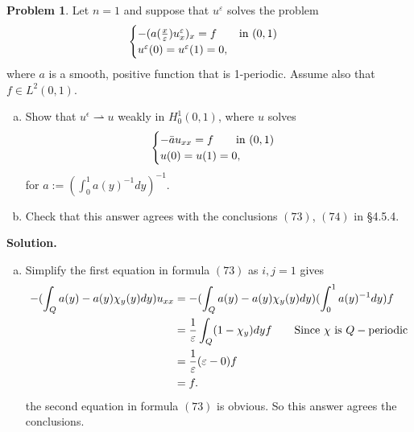 \documentclass[a4paper]{book}
\newenvironment{solution}%
{\noindent\textbf{Solution.}}%
{\qedhere}
\numberwithin{equation}{chapter}
\theoremstyle{definition}
\newtheorem{pro}[exm]{Problem}
\begin{document}
\begin{pro}
  Let $n = 1$ and  suppose that $u^\varepsilon$ solves the problem
  \begin{align*}
    \begin{cases}
      -(a(\frac{x}{\varepsilon})u_x^\varepsilon)_x = f \qquad \textmd{in } (0,1) \\
      u^\varepsilon(0) = u^\varepsilon(1) = 0,
    \end{cases}
  \end{align*}
  where $a$ is a smooth, positive function that is 1-periodic. Assume also that $f \in L^2(0,1)$.
  \begin{enumerate}[(a)]
  \item Show that $u^\epsilon \rightharpoonup u$ weakly in $H^1_0(0,1)$, where $u$ solves
    \begin{align*}
      \begin{cases}
        - \bar{a} u_{xx} = f \qquad \textmd{in } (0,1) \\
        u(0) = u(1) = 0,
      \end{cases}
    \end{align*}
    for $a := (\int^1_0 a(y)^{-1} dy)^{-1}$.

  \item Check that this answer agrees with the conclusions $(73)$, $(74)$ in \S4.5.4.
  \end{enumerate}
\end{pro}

\begin{solution}
  \begin{enumerate}[(b)]
  \item Simplify the first equation in formula $(73)$ as $i,j = 1$ gives
    \begin{align*}
      -(\int_Q a(y) - a(y) \chi_y(y) dy) u_{xx} &= - (\int_Q a(y) - a(y) \chi_y(y) dy) (\int_0^1 a(y)^{-1}dy) f \\
                                                &= \frac{1}{\varepsilon}\int_Q(1 - \chi_y) dy f \qquad \textmd{Since } \chi \textmd{ is } Q-\textmd{periodic} \\
      &= \frac{1}{\varepsilon} (\varepsilon - 0) f \\
      &= f.
    \end{align*}
    the second equation in formula $(73)$ is obvious. So this answer agrees the conclusions.
  \end{enumerate}
\end{solution}
\end{document}
